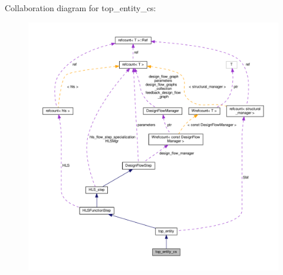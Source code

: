 Collaboration diagram for top\+\_\+entity\+\_\+cs\+:
\nopagebreak
\begin{figure}[H]
\begin{center}
\leavevmode
\includegraphics[width=350pt]{d9/d3a/classtop__entity__cs__coll__graph}
\end{center}
\end{figure}
